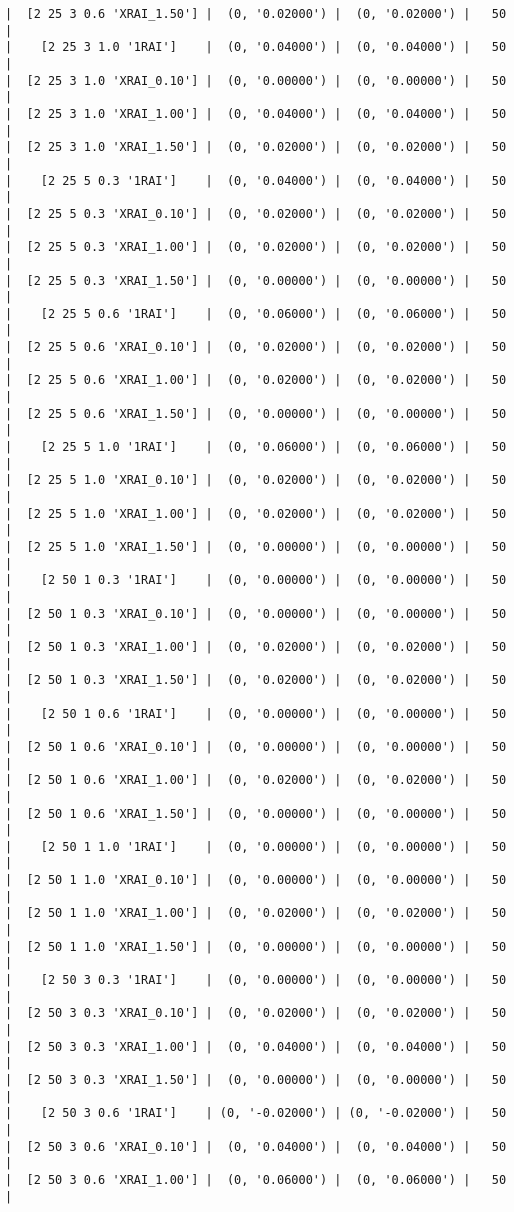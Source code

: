 \documentclass{article}
\begin{document}
\begin{verbatim}
|  [2 25 3 0.6 'XRAI_1.50'] |  (0, '0.02000') |  (0, '0.02000') |   50  |
|    [2 25 3 1.0 '1RAI']    |  (0, '0.04000') |  (0, '0.04000') |   50  |
|  [2 25 3 1.0 'XRAI_0.10'] |  (0, '0.00000') |  (0, '0.00000') |   50  |
|  [2 25 3 1.0 'XRAI_1.00'] |  (0, '0.04000') |  (0, '0.04000') |   50  |
|  [2 25 3 1.0 'XRAI_1.50'] |  (0, '0.02000') |  (0, '0.02000') |   50  |
|    [2 25 5 0.3 '1RAI']    |  (0, '0.04000') |  (0, '0.04000') |   50  |
|  [2 25 5 0.3 'XRAI_0.10'] |  (0, '0.02000') |  (0, '0.02000') |   50  |
|  [2 25 5 0.3 'XRAI_1.00'] |  (0, '0.02000') |  (0, '0.02000') |   50  |
|  [2 25 5 0.3 'XRAI_1.50'] |  (0, '0.00000') |  (0, '0.00000') |   50  |
|    [2 25 5 0.6 '1RAI']    |  (0, '0.06000') |  (0, '0.06000') |   50  |
|  [2 25 5 0.6 'XRAI_0.10'] |  (0, '0.02000') |  (0, '0.02000') |   50  |
|  [2 25 5 0.6 'XRAI_1.00'] |  (0, '0.02000') |  (0, '0.02000') |   50  |
|  [2 25 5 0.6 'XRAI_1.50'] |  (0, '0.00000') |  (0, '0.00000') |   50  |
|    [2 25 5 1.0 '1RAI']    |  (0, '0.06000') |  (0, '0.06000') |   50  |
|  [2 25 5 1.0 'XRAI_0.10'] |  (0, '0.02000') |  (0, '0.02000') |   50  |
|  [2 25 5 1.0 'XRAI_1.00'] |  (0, '0.02000') |  (0, '0.02000') |   50  |
|  [2 25 5 1.0 'XRAI_1.50'] |  (0, '0.00000') |  (0, '0.00000') |   50  |
|    [2 50 1 0.3 '1RAI']    |  (0, '0.00000') |  (0, '0.00000') |   50  |
|  [2 50 1 0.3 'XRAI_0.10'] |  (0, '0.00000') |  (0, '0.00000') |   50  |
|  [2 50 1 0.3 'XRAI_1.00'] |  (0, '0.02000') |  (0, '0.02000') |   50  |
|  [2 50 1 0.3 'XRAI_1.50'] |  (0, '0.02000') |  (0, '0.02000') |   50  |
|    [2 50 1 0.6 '1RAI']    |  (0, '0.00000') |  (0, '0.00000') |   50  |
|  [2 50 1 0.6 'XRAI_0.10'] |  (0, '0.00000') |  (0, '0.00000') |   50  |
|  [2 50 1 0.6 'XRAI_1.00'] |  (0, '0.02000') |  (0, '0.02000') |   50  |
|  [2 50 1 0.6 'XRAI_1.50'] |  (0, '0.00000') |  (0, '0.00000') |   50  |
|    [2 50 1 1.0 '1RAI']    |  (0, '0.00000') |  (0, '0.00000') |   50  |
|  [2 50 1 1.0 'XRAI_0.10'] |  (0, '0.00000') |  (0, '0.00000') |   50  |
|  [2 50 1 1.0 'XRAI_1.00'] |  (0, '0.02000') |  (0, '0.02000') |   50  |
|  [2 50 1 1.0 'XRAI_1.50'] |  (0, '0.00000') |  (0, '0.00000') |   50  |
|    [2 50 3 0.3 '1RAI']    |  (0, '0.00000') |  (0, '0.00000') |   50  |
|  [2 50 3 0.3 'XRAI_0.10'] |  (0, '0.02000') |  (0, '0.02000') |   50  |
|  [2 50 3 0.3 'XRAI_1.00'] |  (0, '0.04000') |  (0, '0.04000') |   50  |
|  [2 50 3 0.3 'XRAI_1.50'] |  (0, '0.00000') |  (0, '0.00000') |   50  |
|    [2 50 3 0.6 '1RAI']    | (0, '-0.02000') | (0, '-0.02000') |   50  |
|  [2 50 3 0.6 'XRAI_0.10'] |  (0, '0.04000') |  (0, '0.04000') |   50  |
|  [2 50 3 0.6 'XRAI_1.00'] |  (0, '0.06000') |  (0, '0.06000') |   50  |

\end{verbatim}
\end{document}
